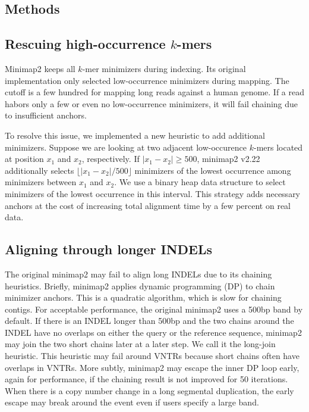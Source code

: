 \documentclass{bioinfo}
\begin{document}
\begin{methods}
\section{Methods}

\subsection{Rescuing high-occurrence $k$-mers}
Minimap2 keeps all $k$-mer minimizers during indexing. Its original
implementation only selected low-occurrence minimizers during mapping. The
cutoff is a few hundred for mapping long reads against a human genome. If a
read habors only a few or even no low-occurrence minimizers, it will fail
chaining due to insufficient anchors.

To resolve this issue, we implemented a new heuristic to add additional
minimizers. Suppose we are looking at two adjacent low-occurence $k$-mers
located at position $x_1$ and $x_2$, respectively. If $|x_1-x_2|\ge500$,
minimap2 v2.22 additionally selects $\lfloor|x_1-x_2|/500\rfloor$ minimizers
of the lowest occurrence among minimizers between $x_1$ and $x_2$.
We use a binary heap data
structure to select minimizers of the lowest occurrence in this interval.
This strategy adds necessary anchors at the cost of increasing total alignment
time by a few percent on real data.

\subsection{Aligning through longer INDELs}
The original minimap2 may fail to align long INDELs due to its chaining
heuristics. Briefly, minimap2 applies dynamic programming (DP) to chain
minimizer anchors. This is a quadratic algorithm, which is slow for chaining
contigs. For acceptable performance, the original minimap2 uses a 500bp band by
default. If there is an INDEL longer than 500bp and the two chains around the INDEL
have no overlaps on either the query or the reference sequence, minimap2 may
join the two short chains later at a later step. We call it the
long-join heuristic. This heuristic may fail around VNTRs because short chains
often have overlaps in VNTRs. More subtly, minimap2 may escape the inner DP
loop early, again for performance, if the chaining result is not improved for
50 iterations. When there is a copy number change in a long segmental
duplication, the early escape may break around the event even if users
specify a large band.


\end{methods}
\end{document}
